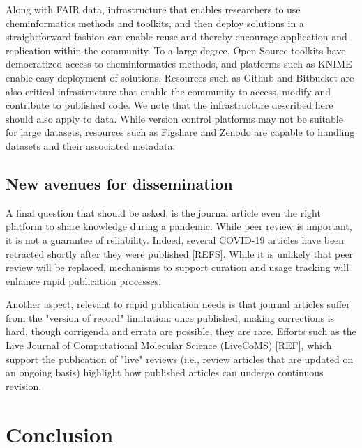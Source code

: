 \documentclass{bmcart}
\begin{document}
Along with FAIR data, infrastructure that enables researchers to use
cheminformatics methods and toolkits, and then deploy solutions in a
straightforward fashion can enable reuse and thereby encourage
application and replication within the community. To a large degree,
Open Source toolkits have democratized access to cheminformatics
methods, and platforms such as KNIME enable easy deployment of
solutions. Resources such as Github and Bitbucket are also critical
infrastructure that enable the community to access, modify and
contribute to published code. We note that the infrastructure
described here should also apply to data. While version control
platforms may not be suitable for large datasets, resources such as
Figshare and Zenodo are capable to handling datasets and their
associated metadata.


\subsection*{New avenues for dissemination}

A final question that should be asked, is the journal article even the
right platform to share knowledge during a pandemic. While peer review
is important, it is not a guarantee of reliability. Indeed, several
COVID-19 articles have been retracted shortly after they were published
[REFS]. While it is unlikely that peer review will be replaced,
mechanisms to support curation and usage tracking will enhance
rapid publication processes.

Another aspect, relevant to rapid publication needs is that journal
articles suffer from the "version of record" limitation: once
published, making corrections is hard, though corrigenda and
errata are possible, they are rare. Efforts such as the Live Journal
of Computational Molecular Science (LiveCoMS) [REF], which support the
publication of "live" reviews (i.e., review articles that are updated
on an ongoing basis) highlight how published articles can undergo
continuous revision.


\section*{Conclusion}
\end{document}
